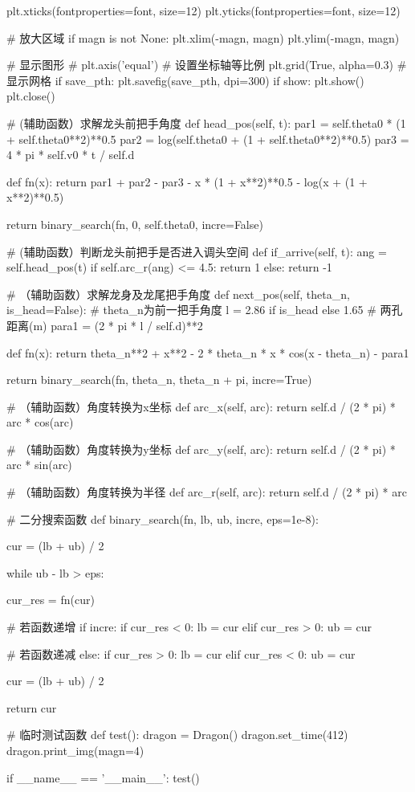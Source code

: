 \documentclass[withoutpreface,bwprint]{cumcmthesis}
\begin{document}
\begin{CodeText}
plt.xticks(fontproperties=font, size=12)
plt.yticks(fontproperties=font, size=12)


   # 放大区域
   if magn is not None:
      plt.xlim(-magn, magn)
      plt.ylim(-magn, magn)

   # 显示图形
   # plt.axis('equal') # 设置坐标轴等比例
   plt.grid(True, alpha=0.3) # 显示网格
   if save_pth:
      plt.savefig(save_pth, dpi=300)
   if show:
      plt.show()
   plt.close()

# (辅助函数）求解龙头前把手角度
def head_pos(self, t):
   par1 = self.theta0 * (1 + self.theta0**2)**0.5
   par2 = log(self.theta0 + (1 + self.theta0**2)**0.5)
   par3 = 4 * pi * self.v0 * t / self.d

   def fn(x):
      return par1 + par2 - par3 - x * (1 + x**2)**0.5 - log(x + (1 + x**2)**0.5)

   return binary_search(fn, 0, self.theta0, incre=False)

# (辅助函数）判断龙头前把手是否进入调头空间
def if_arrive(self, t):
   ang = self.head_pos(t)
   if self.arc_r(ang) <= 4.5:
      return 1
   else:
      return -1

# （辅助函数）求解龙身及龙尾把手角度
def next_pos(self, theta_n, is_head=False): # theta_n为前一把手角度
   l = 2.86 if is_head else 1.65 # 两孔距离(m)
   para1 = (2 * pi * l / self.d)**2

   def fn(x):
      return theta_n**2 + x**2 - 2 * theta_n * x * cos(x - theta_n) - para1

   return binary_search(fn, theta_n, theta_n + pi, incre=True)

# （辅助函数）角度转换为x坐标
def arc_x(self, arc):
   return self.d / (2 * pi) * arc * cos(arc)


   # （辅助函数）角度转换为y坐标
   def arc_y(self, arc):
      return self.d / (2 * pi) * arc * sin(arc)

   # （辅助函数）角度转换为半径
   def arc_r(self, arc):
      return self.d / (2 * pi) * arc


# 二分搜索函数
def binary_search(fn, lb, ub, incre, eps=1e-8):

   cur = (lb + ub) / 2

   while ub - lb > eps:

      cur_res = fn(cur)

      # 若函数递增
      if incre:
            if cur_res < 0:
                lb = cur
            elif cur_res > 0:
                ub = cur

      # 若函数递减
      else:
            if cur_res > 0:
                lb = cur
            elif cur_res < 0:
                ub = cur

      cur = (lb + ub) / 2

   return cur


# 临时测试函数
def test():
   dragon = Dragon()
   dragon.set_time(412)
   dragon.print_img(magn=4)


if __name__ == '__main__':
   test()
\end{CodeText}
\end{document}
